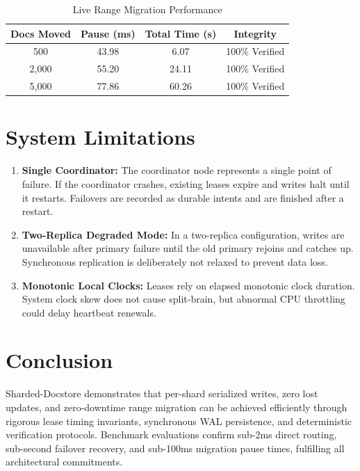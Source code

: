 \documentclass[10pt,journal,compsoc]{IEEEtran}
\begin{document}
\begin{table}[ht]
\centering
\caption{Live Range Migration Performance}
\label{tab:migration}
\begin{tabular}{cccc}
\toprule
\textbf{Docs Moved} & \textbf{Pause (ms)} & \textbf{Total Time (s)} & \textbf{Integrity} \\
\midrule
500   & 43.98 & 6.07  & 100\% Verified \\
2,000 & 55.20 & 24.11 & 100\% Verified \\
5,000 & 77.86 & 60.26 & 100\% Verified \\
\bottomrule
\end{tabular}
\end{table}

\section{System Limitations}
\begin{enumerate}
    \item \textbf{Single Coordinator:} The coordinator node represents a single point of failure. If the coordinator crashes, existing leases expire and writes halt until it restarts. Failovers are recorded as durable intents and are finished after a restart.
    \item \textbf{Two-Replica Degraded Mode:} In a two-replica configuration, writes are unavailable after primary failure until the old primary rejoins and catches up. Synchronous replication is deliberately not relaxed to prevent data loss.
    \item \textbf{Monotonic Local Clocks:} Leases rely on elapsed monotonic clock duration. System clock skew does not cause split-brain, but abnormal CPU throttling could delay heartbeat renewals.
\end{enumerate}

\section{Conclusion}
Sharded-Docstore demonstrates that per-shard serialized writes, zero lost updates, and zero-downtime range migration can be achieved efficiently through rigorous lease timing invariants, synchronous WAL persistence, and deterministic verification protocols. Benchmark evaluations confirm sub-2ms direct routing, sub-second failover recovery, and sub-100ms migration pause times, fulfilling all architectural commitments.
\end{document}
